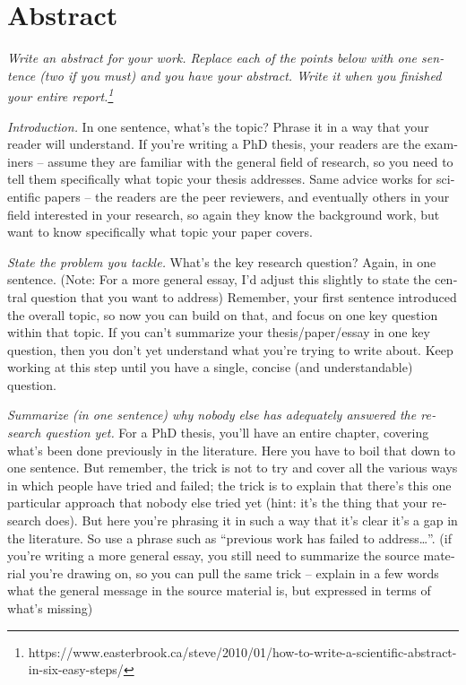 \documentclass[
  fontsize=10pt
  numbers=noenddot,
  english,  %
  paper=a5,
  twoside,  %
  DIV=calc,
  headings=small,
  bibliography=totoc,
  listof=totoc,
  draft=false
]{scrbook}
\theoremstyle{break}
\begin{document}
\chapter*{Abstract}
\begin{otherlanguage}{american}
\emph{Write an abstract for your work. Replace each of the points below with one sentence (two if you must) and you have your abstract. Write it when you finished your entire report.\footnote{https://www.easterbrook.ca/steve/2010/01/how-to-write-a-scientific-abstract-in-six-easy-steps/}}

\emph{Introduction.} In one sentence, what’s the topic? Phrase it in a way that your reader will understand. If you’re writing a PhD thesis, your readers are the examiners – assume they are familiar with the general field of research, so you need to tell them specifically what topic your thesis addresses. Same advice works for scientific papers – the readers are the peer reviewers, and eventually others in your field interested in your research, so again they know the background work, but want to know specifically what topic your paper covers.

\emph{State the problem you tackle.} What’s the key research question? Again, in one sentence. (Note: For a more general essay, I’d adjust this slightly to state the central question that you want to address) Remember, your first sentence introduced the overall topic, so now you can build on that, and focus on one key question within that topic. If you can’t summarize your thesis/paper/essay in one key question, then you don’t yet understand what you’re trying to write about. Keep working at this step until you have a single, concise (and understandable) question.

\emph{Summarize (in one sentence) why nobody else has adequately answered the research question yet.} For a PhD thesis, you’ll have an entire chapter, covering what’s been done previously in the literature. Here you have to boil that down to one sentence. But remember, the trick is not to try and cover all the various ways in which people have tried and failed; the trick is to explain that there’s this one particular approach that nobody else tried yet (hint: it’s the thing that your research does). But here you’re phrasing it in such a way that it’s clear it’s a gap in the literature. So use a phrase such as “previous work has failed to address…”. (if you’re writing a more general essay, you still need to summarize the source material you’re drawing on, so you can pull the same trick – explain in a few words what the general message in the source material is, but expressed in terms of what’s missing)


\end{otherlanguage}
\end{document}
